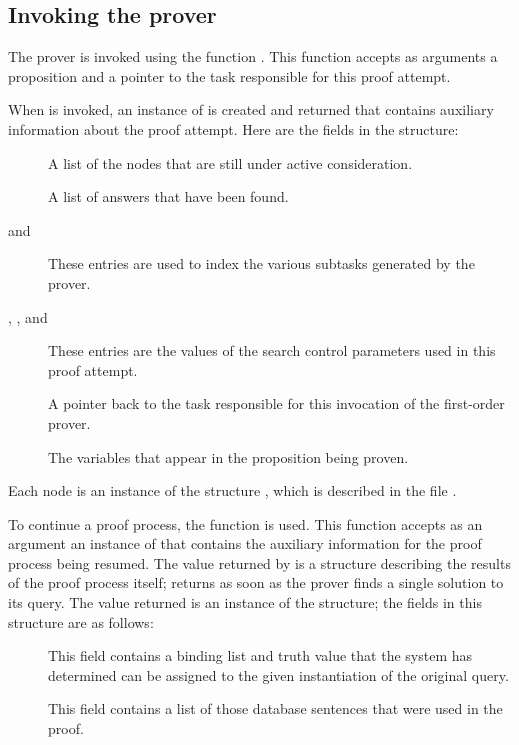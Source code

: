 \subsection{Invoking the prover}

The prover is invoked using the function .  This
function accepts as arguments a proposition and a pointer to the task
responsible for this proof attempt.

When  is invoked, an instance of 
is created and returned that contains auxiliary information about the
proof attempt.  Here are the fields in the structure:
 \begin{description}
 \item [] A list of the nodes that are still
under active consideration.
 \item [] A list of answers that have been found.
 \item [ and ] These entries are used to
index the various subtasks generated by the prover.
 \item [, , 
and ] These entries are the values of the search
control parameters used in this proof attempt.
 \item [] A pointer back to the task responsible
for this invocation of the first-order prover.
 \item [] The variables that appear in the proposition
being proven.
 \end{description}

Each node is an instance of the structure , which is
described in the file .

To continue a proof process, the function  is used.
This function accepts as an argument an instance of  that
contains the auxiliary information for the proof process being
resumed.  The value returned by  is a structure
describing the results of the proof process itself;
 returns as soon as the prover finds a single
solution to its query.  The value returned is an instance of the
 structure; the
fields in this structure are as follows:
 \begin{description}
 \item[] This field contains a binding list and truth
value that the system has determined can be assigned to the given
instantiation of the original query.
 \item[] This field contains a list of those database
sentences that were used in the proof.
 \end{description}

